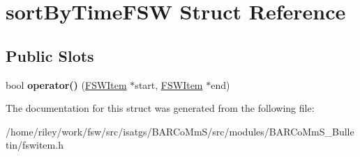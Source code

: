 \hypertarget{structsort_by_time_f_s_w}{}\section{sort\+By\+Time\+F\+SW Struct Reference}
\label{structsort_by_time_f_s_w}
\subsection*{Public Slots}
\begin{DoxyCompactItemize}
\item 
bool {\bfseries operator()} (\hyperlink{class_f_s_w_item}{F\+S\+W\+Item} $\ast$start, \hyperlink{class_f_s_w_item}{F\+S\+W\+Item} $\ast$end)\hypertarget{structsort_by_time_f_s_w_a70093a9584f37dc50b4ce09ef02190f9}{}\label{structsort_by_time_f_s_w_a70093a9584f37dc50b4ce09ef02190f9}

\end{DoxyCompactItemize}


The documentation for this struct was generated from the following file\+:\begin{DoxyCompactItemize}
\item 
/home/riley/work/fsw/src/isatgs/\+B\+A\+R\+Co\+Mm\+S/src/modules/\+B\+A\+R\+Co\+Mm\+S\+\_\+\+Bulletin/fswitem.\+h\end{DoxyCompactItemize}
